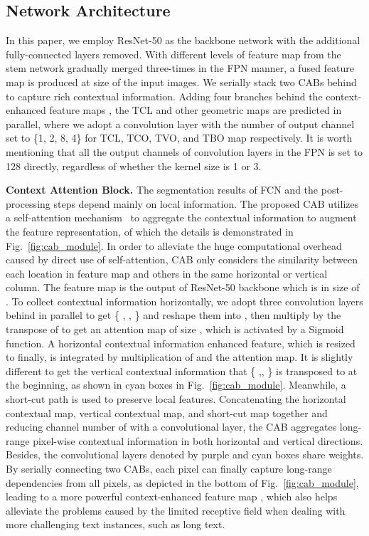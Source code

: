 \documentclass[sigconf]{acmart}
\begin{document}
\subsection{Network Architecture}

In this paper, we employ ResNet-50 as the backbone network with the additional fully-connected layers removed. With different levels of feature map from the stem network gradually merged three-times in the FPN manner, a fused feature map  is produced at  size of the input images. We serially stack two CABs behind to capture rich contextual information. Adding four branches behind the context-enhanced feature maps , the TCL and other geometric maps are predicted in parallel, where we adopt a  convolution layer with the number of output channel set to \{1, 2, 8, 4\} for TCL, TCO, TVO, and TBO map respectively. It is worth mentioning that all the output channels of convolution layers in the FPN is set to 128 directly, regardless of whether the kernel size is 1 or 3.

\textbf{Context Attention Block.} The segmentation results of FCN and the post-processing steps depend mainly on local information. The proposed CAB utilizes a self-attention mechanism~\cite{vaswani2017attention} to aggregate the contextual information to augment the feature representation, of which the details is demonstrated in Fig.~\ref{fig:cab_module}. 
In order to alleviate the huge computational overhead caused by direct use of self-attention, CAB only considers the similarity between each location in feature map and others in the same horizontal or vertical column.
The feature map   is the output of ResNet-50 backbone which is in size of . 
To collect contextual information horizontally, we adopt three convolution layers behind  in parallel to get \{ , ,  \} and reshape them into  , then multiply  by the transpose of  to get an attention map of size , which is activated by a Sigmoid function. A horizontal contextual information enhanced feature, which is resized to  finally, is integrated by multiplication of  and the attention map. 
It is slightly different to get the vertical contextual information that \{ ,, \} is transposed to   at the beginning, as shown in cyan boxes in Fig.~\ref{fig:cab_module}. Meanwhile, a short-cut path is used to preserve local features. Concatenating the horizontal contextual map, vertical contextual map,  and short-cut map together and reducing channel number of   with a  convolutional layer, the CAB aggregates long-range pixel-wise contextual information in both horizontal and vertical directions. Besides, the convolutional layers denoted by purple and cyan boxes share weights. By serially connecting two CABs, each pixel can finally capture long-range dependencies from all pixels, as depicted in the bottom of Fig.~\ref{fig:cab_module}, leading to a more powerful context-enhanced feature map , which also helps alleviate the problems caused by the limited receptive field when dealing with more challenging text instances, such as long text.
\end{document}
